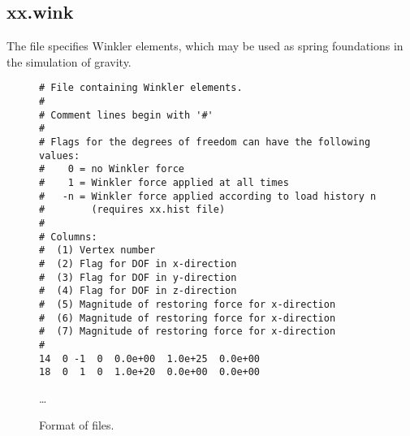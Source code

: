 \subsection{xx.wink}

The  file specifies Winkler elements, which may be
used as spring foundations in the simulation of gravity.

\begin{figure}
  \begin{center}
\begin{verbatim}
# File containing Winkler elements.
#
# Comment lines begin with '#'
#
# Flags for the degrees of freedom can have the following values:
#    0 = no Winkler force
#    1 = Winkler force applied at all times
#   -n = Winkler force applied according to load history n
#        (requires xx.hist file)
#
# Columns:
#  (1) Vertex number
#  (2) Flag for DOF in x-direction
#  (3) Flag for DOF in y-direction
#  (4) Flag for DOF in z-direction
#  (5) Magnitude of restoring force for x-direction
#  (6) Magnitude of restoring force for x-direction
#  (7) Magnitude of restoring force for x-direction
#
14  0 -1  0  0.0e+00  1.0e+25  0.0e+00
18  0  1  0  1.0e+20  0.0e+00  0.0e+00
\end{verbatim}
    \ldots
    \caption{Format of  files.}
  \end{center}
\end{figure}
